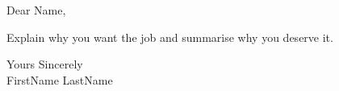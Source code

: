 \documentclass[a4paper,english]{friggeri-letter}
\begin{document}

\address{
	123 Fake St \\
	Australia
}


\opening{Dear Name,}

Explain why you want the job and summarise why you deserve it.

\closing{
   Yours Sincerely\\
   FirstName LastName
}
\end{document}
